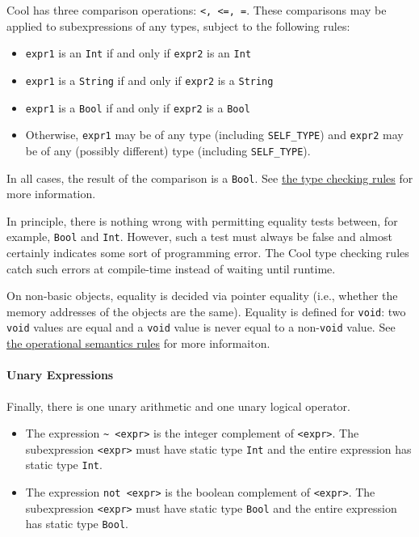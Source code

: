\documentclass[]{article}
\begin{document}
Cool has three comparison operations:
\texttt{\textless{}, \textless{}=, =}. These comparisons may be applied
to subexpressions of any types, subject to the following rules:

\begin{itemize}
\itemsep1pt\parskip0pt
\item
  \texttt{expr1} is an \texttt{Int} if and only if \texttt{expr2} is an
  \texttt{Int}
\item
  \texttt{expr1} is a \texttt{String} if and only if \texttt{expr2} is a
  \texttt{String}
\item
  \texttt{expr1} is a \texttt{Bool} if and only if \texttt{expr2} is a
  \texttt{Bool}
\item
  Otherwise, \texttt{expr1} may be of any type (including
  \texttt{SELF\_TYPE}) and \texttt{expr2} may be of any (possibly
  different) type (including \texttt{SELF\_TYPE}).
\end{itemize}

In all cases, the result of the comparison is a \texttt{Bool}. See
\href{node43.html}{the type checking rules} for more information.

In principle, there is nothing wrong with permitting equality tests
between, for example, \texttt{Bool} and \texttt{Int}. However, such a
test must always be false and almost certainly indicates some sort of
programming error. The Cool type checking rules catch such errors at
compile-time instead of waiting until runtime.

On non-basic objects, equality is decided via pointer equality (i.e.,
whether the memory addresses of the objects are the same). Equality is
defined for \texttt{void}: two \texttt{void} values are equal and a
\texttt{void} value is never equal to a non-\texttt{void} value. See
\href{node48.html}{the operational semantics rules} for more
informaiton.

\paragraph{Unary Expressions}

Finally, there is one unary arithmetic and one unary logical operator.

\begin{itemize}
\itemsep1pt\parskip0pt
\item
  The expression
  \texttt{\textasciitilde{} \textless{}expr\textgreater{}} is the
  integer complement of \texttt{\textless{}expr\textgreater{}}. The
  subexpression \texttt{\textless{}expr\textgreater{}} must have static
  type \texttt{Int} and the entire expression has static type
  \texttt{Int}.
\item
  The expression \texttt{not \textless{}expr\textgreater{}} is the
  boolean complement of \texttt{\textless{}expr\textgreater{}}. The
  subexpression \texttt{\textless{}expr\textgreater{}} must have static
  type \texttt{Bool} and the entire expression has static type
  \texttt{Bool}.
\end{itemize}
\end{document}
